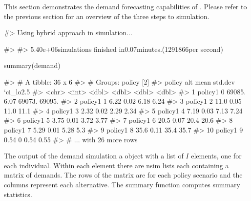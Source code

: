 This section demonstrates the demand forecasting capabilities of
. Please refer to the previous section for an overview of
the three steps to simulation.

\begin{Schunk}
\begin{Soutput}
#> Using hybrid approach in simulation...
\end{Soutput}
\begin{Soutput}
#> 
#> 5.40e+06simulations finished in0.07minutes.(1291866per second)
\end{Soutput}
\begin{Sinput}
summary(demand)
\end{Sinput}
\begin{Soutput}
#> # A tibble: 36 x 6
#> # Groups:   policy [2]
#>    policy    alt     mean std.dev `ci_lo2.5%` `ci_hi97.5%`
#>    <chr>   <int>    <dbl>   <dbl>       <dbl>        <dbl>
#>  1 policy1     0 69085.      6.07    69073.       69095.  
#>  2 policy1     1     6.22    0.02        6.18         6.24
#>  3 policy1     2    11.0     0.05       11.0         11.1 
#>  4 policy1     3     2.32    0.02        2.29         2.34
#>  5 policy1     4     7.19    0.03        7.13         7.24
#>  6 policy1     5     3.75    0.01        3.72         3.77
#>  7 policy1     6    20.5     0.07       20.4         20.6 
#>  8 policy1     7     5.29    0.01        5.28         5.3 
#>  9 policy1     8    35.6     0.11       35.4         35.7 
#> 10 policy1     9     0.54    0           0.54         0.55
#> # ... with 26 more rows
\end{Soutput}
\end{Schunk}

The output of the demand simulation a  object with a
list of \(I\) elements, one for each individual. Within each element
there are nsim lists each containing a matrix of demands. The rows of
the matrix are for each policy scenario and the columns represent each
alternative. The summary function computes summary statistics.

